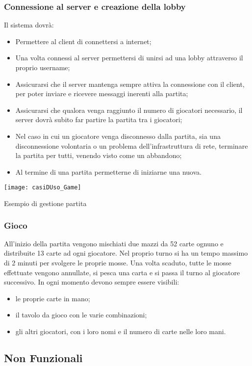 \subsubsection{Connessione al server e creazione della lobby}
Il sistema dovrà:
\begin{itemize}
    \item Permettere al client di connettersi a internet;
    \item Una volta connessi al server permettersi di unirsi ad una lobby attraverso il proprio username;
    \item Assicurarsi che il server mantenga sempre attiva la connessione con il client, per poter inviare e ricevere messaggi inerenti alla partita;
    \item Assicurarsi che qualora venga raggiunto il numero di giocatori necessario, il server dovrà subito far partire la partita tra i giocatori;
    \item Nel caso in cui un giocatore venga disconnesso dalla partita, sia una disconnessione volontaria o un problema dell’infrastruttura di rete, terminare la partita per tutti, venendo visto come un abbandono;
    \item Al termine di una partita permetterne di iniziarne una nuova.
\end{itemize}
\begin{center}
    \texttt{[image: casiDUso\_Game]}
\end{center}
\hspace{4cm}Esempio di gestione partita
\subsubsection{Gioco}
All’inizio della partita vengono mischiati due mazzi da 52 carte ognuno e distribuite 13 carte ad ogni giocatore.
Nel proprio turno si ha un tempo massimo di 2 minuti per svolgere le proprie mosse.
Una volta scaduto, tutte le mosse effettuate vengono annullate, si pesca una carta e si passa il turno al giocatore successivo.
In ogni momento devono sempre essere visibili:
\begin{itemize}
    \item le proprie carte in mano;
    \item il tavolo da gioco con le varie combinazioni;
    \item gli altri giocatori, con i loro nomi e il numero di carte nelle loro mani.
\end{itemize}

\subsection{Non Funzionali}

